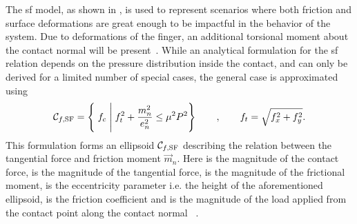 The \gls{sf} model, as shown in , is used to represent scenarios where both friction and surface deformations are great enough to be impactful in the behavior of the system. Due to deformations of the finger, an additional torsional moment about the contact normal will be present~\cite[Chapter 38]{handbook-of-robotics}. While an analytical formulation for the \gls{sf} relation depends on the pressure distribution inside the contact, and can only be derived for a limited number of special cases, the general case is approximated using 
%
\begin{equation} 
	\mathcal{C}_{f,\text{SF}} = \left\{ \; f_c \; \middle| \; f_t^2 + \frac{m_n^2}{e_n^2} \le \mu^2 P^2 \right\} \qquad , \qquad f_t = \sqrt{f_x^2 + f_y^2}.
	\label{eq:sf}
\end{equation}
This formulation forms an ellipsoid $\mathcal{C}_{f,\text{SF}}$ describing the relation between the tangential force  and friction moment $\vec{m}_n$. Here  is the magnitude of the contact force,  is the magnitude of the tangential force,  is the magnitude of the frictional moment,  is the eccentricity parameter i.e. the height of the aforementioned ellipsoid, \mvar{\mu} is the friction coefficient and  is the magnitude of the load applied from the contact point along the contact normal ~\cite{practical-force-motion-models-for-sliding-manipulation, soft-finger-model-with-adaptive-contact-geometry-for-grasping-and-manipulation-tasks}. \medskip

